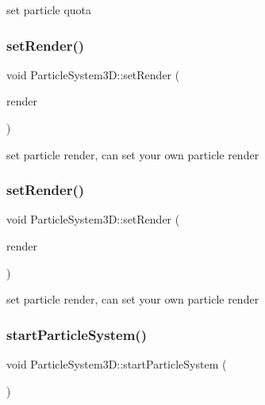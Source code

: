 set particle quota \mbox{\label{classParticleSystem3D_abeb1c12eab97f24cd02adeb6453d6f2a}} 
\subsubsection{\texorpdfstring{set\+Render()}{setRender()}\hspace{0.1cm}{\footnotesize\ttfamily [1/2]}}
{\footnotesize\ttfamily void Particle\+System3\+D\+::set\+Render (\begin{DoxyParamCaption}\item[{\hyperlink{classParticle3DRender}{Particle3\+D\+Render} $\ast$}]{render }\end{DoxyParamCaption})}

set particle render, can set your own particle render \mbox{\label{classParticleSystem3D_abeb1c12eab97f24cd02adeb6453d6f2a}} 
\subsubsection{\texorpdfstring{set\+Render()}{setRender()}\hspace{0.1cm}{\footnotesize\ttfamily [2/2]}}
{\footnotesize\ttfamily void Particle\+System3\+D\+::set\+Render (\begin{DoxyParamCaption}\item[{\hyperlink{classParticle3DRender}{Particle3\+D\+Render} $\ast$}]{render }\end{DoxyParamCaption})}

set particle render, can set your own particle render \mbox{\label{classParticleSystem3D_aecd79152c049fc63e5ea464589765e5b}} 
\subsubsection{\texorpdfstring{start\+Particle\+System()}{startParticleSystem()}\hspace{0.1cm}{\footnotesize\ttfamily [1/2]}}
{\footnotesize\ttfamily void Particle\+System3\+D\+::start\+Particle\+System (\begin{DoxyParamCaption}{ }\end{DoxyParamCaption})\hspace{0.3cm}{\ttfamily [virtual]}}

